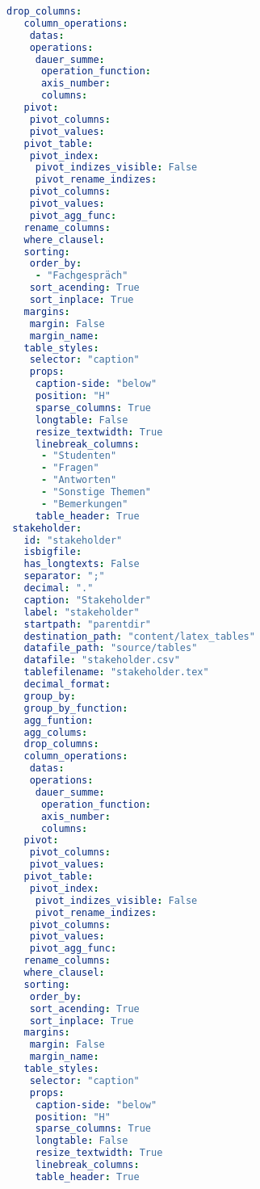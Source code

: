 \begin{lstlisting}[language=yaml, caption=Python LaTex - csv\_to\_latex\_diplomarbeit.yaml - Konfigurationsdatei - CSV - LaTex-Tabelle,captionpos=b,label={lst:csv_to_latex_diplomarbeit},breaklines=true]
   drop_columns:
   column_operations:
    datas:
    operations:
     dauer_summe:
      operation_function:
      axis_number:
      columns:
   pivot:
    pivot_columns:
    pivot_values:
   pivot_table:
    pivot_index:
     pivot_indizes_visible: False
     pivot_rename_indizes:
    pivot_columns:
    pivot_values:
    pivot_agg_func:
   rename_columns:
   where_clausel:
   sorting:
    order_by:
     - "Fachgespräch"
    sort_acending: True
    sort_inplace: True
   margins:
    margin: False
    margin_name:
   table_styles:
    selector: "caption"
    props:
     caption-side: "below"
     position: "H"
     sparse_columns: True
     longtable: False
     resize_textwidth: True
     linebreak_columns:
      - "Studenten"
      - "Fragen"
      - "Antworten"
      - "Sonstige Themen"
      - "Bemerkungen"
     table_header: True
 stakeholder:
   id: "stakeholder"
   isbigfile:
   has_longtexts: False
   separator: ";"
   decimal: "."
   caption: "Stakeholder"
   label: "stakeholder"
   startpath: "parentdir"
   destination_path: "content/latex_tables"
   datafile_path: "source/tables"
   datafile: "stakeholder.csv"
   tablefilename: "stakeholder.tex"
   decimal_format:
   group_by:
   group_by_function:
   agg_funtion:
   agg_colums:
   drop_columns:
   column_operations:
    datas:
    operations:
     dauer_summe:
      operation_function:
      axis_number:
      columns:
   pivot:
    pivot_columns:
    pivot_values:
   pivot_table:
    pivot_index:
     pivot_indizes_visible: False
     pivot_rename_indizes:
    pivot_columns:
    pivot_values:
    pivot_agg_func:
   rename_columns:
   where_clausel:
   sorting:
    order_by:
    sort_acending: True
    sort_inplace: True
   margins:
    margin: False
    margin_name:
   table_styles:
    selector: "caption"
    props:
     caption-side: "below"
     position: "H"
     sparse_columns: True
     longtable: False
     resize_textwidth: True
     linebreak_columns:
     table_header: True
\end{lstlisting}